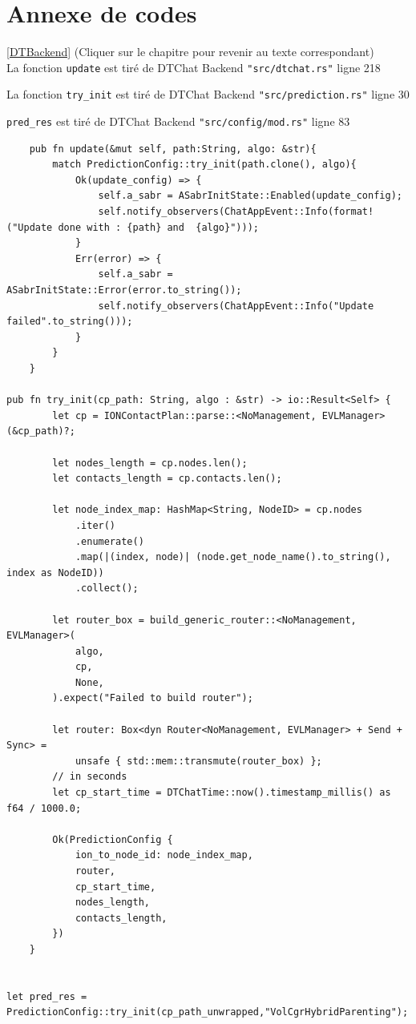 \documentclass{article}
\begin{document}
\section{Annexe de codes}

\label{CodeDTBackend}
\ref{DTBackend} (Cliquer sur le chapitre pour revenir au texte correspondant)\\

La fonction \texttt{update} est tiré de DTChat Backend \texttt{"src/dtchat.rs"} ligne 218

La fonction \texttt{try\_init} est tiré de DTChat Backend \texttt{"src/prediction.rs"} ligne 30

\texttt{pred\_res} est tiré de DTChat Backend \texttt{"src/config/mod.rs"} ligne 83

\begin{verbatim}
    pub fn update(&mut self, path:String, algo: &str){
        match PredictionConfig::try_init(path.clone(), algo){
            Ok(update_config) => {
                self.a_sabr = ASabrInitState::Enabled(update_config);
                self.notify_observers(ChatAppEvent::Info(format!("Update done with : {path} and  {algo}")));
            }
            Err(error) => {
                self.a_sabr = ASabrInitState::Error(error.to_string());
                self.notify_observers(ChatAppEvent::Info("Update failed".to_string()));
            }
        }
    }

pub fn try_init(cp_path: String, algo : &str) -> io::Result<Self> {
        let cp = IONContactPlan::parse::<NoManagement, EVLManager>(&cp_path)?;

        let nodes_length = cp.nodes.len();
        let contacts_length = cp.contacts.len();

        let node_index_map: HashMap<String, NodeID> = cp.nodes
            .iter()
            .enumerate()
            .map(|(index, node)| (node.get_node_name().to_string(), index as NodeID))
            .collect();

        let router_box = build_generic_router::<NoManagement, EVLManager>(
            algo,
            cp,
            None,
        ).expect("Failed to build router");

        let router: Box<dyn Router<NoManagement, EVLManager> + Send + Sync> =
            unsafe { std::mem::transmute(router_box) };
        // in seconds
        let cp_start_time = DTChatTime::now().timestamp_millis() as f64 / 1000.0;

        Ok(PredictionConfig {
            ion_to_node_id: node_index_map,
            router,
            cp_start_time,
            nodes_length,
            contacts_length,
        })
    }


let pred_res = PredictionConfig::try_init(cp_path_unwrapped,"VolCgrHybridParenting");
\end{verbatim}
\end{document}

